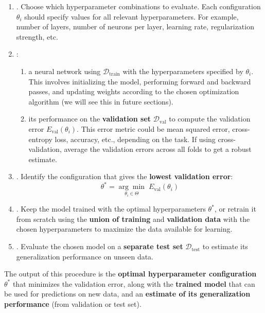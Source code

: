 \begin{enumerate}
    \item {}. Choose which hyperparameter combinations to evaluate. Each configuration $\theta_i$ should specify values for all relevant hyperparameters. For example, number of layers, number of neurons per layer, learning rate, regularization strength, etc.
    \item {}:
    \begin{enumerate}
        \item {} a neural network using $\mathcal{D}_{\text{train}}$ with the hyperparameters specified by $\theta_i$. This involves initializing the model, performing forward and backward passes, and updating weights according to the chosen optimization algorithm (we will see this in future sections).
        \item {} its performance on the \textbf{validation set} $\mathcal{D}_{\text{val}}$ to compute the validation error $E_{\text{val}}(\theta_i)$. This error metric could be mean squared error, cross-entropy loss, accuracy, etc., depending on the task. If using cross-validation, average the validation errors across all folds to get a robust estimate.
    \end{enumerate}
    \item {}. Identify the configuration that gives the \textbf{lowest validation error}:
    \begin{equation*}
        \theta^{*} = \underset{\theta_{i} \in \Theta}{\arg\min} \; E_{\text{val}}\left(\theta_{i}\right)
    \end{equation*}
    \item {}. Keep the model trained with the optimal hyperparameters $\theta^{*}$, or retrain it from scratch using the \textbf{union of training} and \textbf{validation data} with the chosen hyperparameters to maximize the data available for learning.
    \item {}. Evaluate the chosen model on a \textbf{separate test set} $\mathcal{D}_{\text{test}}$ to estimate its generalization performance on unseen data.
\end{enumerate}
The output of this procedure is the \textbf{optimal hyperparameter configuration} $\theta^{*}$ that minimizes the validation error, along with the \textbf{trained model} that can be used for predictions on new data, and an \textbf{estimate of its generalization performance} (from validation or test set).

